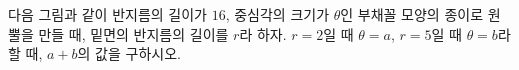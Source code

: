 다음 그림과 같이 반지름의 길이가 $16$, 중심각의 크기가 $\theta$인 부채꼴 모양의 종이로 원뿔을 만들 때, 밑면의 반지름의 길이를 $r$라 하자. $r=2$일 때 $\theta=a$, $r=5$일 때 $\theta=b$라 할 때, $a+b$의 값을 구하시오.
\par\smallskip\begin{center}\resizebox{\ifdim\width>\linewidth\linewidth\else\width\fi}{!}{}\end{center}
